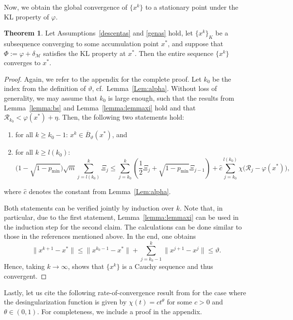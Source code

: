 \documentclass[a4paper, 12pt]{article}
\numberwithin{equation}{section}
\theoremstyle{bolddef}
\theoremstyle{definition}
\theoremstyle{boldplain}
\newtheorem{theorem}[definition]{Theorem}
\newcommand{\xk}{x^k}
\newcommand{\xkp}{x^{k+1}}
\newcommand{\xj}{x^j}
\newcommand{\xjp}{x^{j+1}}
\newcommand{\pmin}{p_{\min}}
\newcommand{\Rvalue}{\mathcal{R}}
\newcommand{\clball}{\overline{B}}
\begin{document}
Now, we obtain the global convergence of $\{\xk\}$ to a stationary point under the KL property of $\varphi$.

\begin{theorem}\label{thm:convergence}
Let Assumptions~\ref{descentas} and \ref{genas} hold, let $\{\xk\}_K$ be a subsequence converging to some accumulation point $x^*$, and suppose that $\Phi:= \varphi + \delta_\mathcal{M}$ satisfies the KL property at $x^*$. Then the entire sequence $\{\xk\}$ converges to $x^*$.
\end{theorem}

\begin{proof}
Again, we refer to the appendix for the complete proof. Let $k_0$ be the index from the definition of $\vartheta$, cf.\ Lemma~\ref{Lem:alpha}.
Without loss of generality, we may assume that $k_0$ is large enough, such that the results from Lemma~\ref{lemma:bs} and Lemma~\ref{lemma:lemmaxi} hold and that $\Rvalue_{k_0} < \varphi(x^*) + \eta$. Then, the following two statements hold:
\begin{enumerate}[label=(\alph*)]
	\item for all $k \geq k_0-1$: $\xk \in \clball_\vartheta(x^*)$, and
	\item for all $k \geq l(k_0)$:
	\begin{equation}\label{eq:statementb}
	\big( 1-\sqrt{1-\pmin} \big) 
		\sqrt{m} \sum_{j = l(k_0)}^k \Xi_j \leq \sum_{j=k_0}^k \left(\frac{1}{2}\Xi_j + \sqrt{1-\pmin} \Xi_{j-1}\right) + \hat c \sum_{j = k_0}^{l(k_0)} \chi \big( \Rvalue_j - \varphi(x^*) \big),
	\end{equation}
\end{enumerate}
where $ \hat{c} $ denotes the constant from Lemma~\ref{Lem:alpha}.

Both statements can be verified jointly by induction over $k$. Note that, in particular, due to the first statement, Lemma~\ref{lemma:lemmaxi} can be used in the induction step for the second claim. The calculations can be done similar to those in the references mentioned above. In the end, one obtains 
	\begin{equation*}
		\|\xkp - x^* \| \leq \|x^{k_0 - 1} - x^* \| + \sum_{j = k_0 - 1}^k \| \xjp - \xj \| \leq \vartheta.
	\end{equation*}
	Hence, taking $k \to \infty$, shows that $\{\xk\}$ is a Cauchy sequence and thus convergent.
\end{proof}

Lastly, let us cite the following rate-of-convergence result from \cite{Qian2024} for the case where the desingularization function is given by $\chi(t) = c t^\theta$ for some $c > 0$ and $\theta \in (0, 1)$. For completeness, we include a proof in the appendix.
\end{document}
